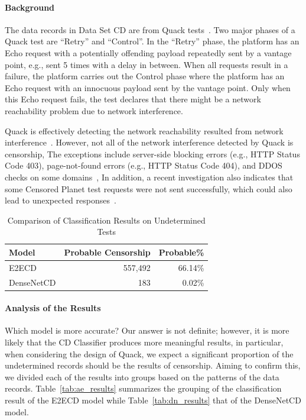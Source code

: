 \paragraph{Background} The data records in Data Set CD are from Quack 
tests~\cite{vandersloot2018quack}. Two major phases of a Quack test are 
``Retry'' and ``Control''. In the ``Retry'' phase, the platform has
an Echo request with a potentially offending payload repeatedly sent by 
a vantage point, e.g., sent 5 times with a delay in between. When all 
requests result in a failure, the platform carries out the Control phase
where the platform has an Echo request with an innocuous payload sent by
the vantage point. Only when this Echo request fails, the test declares
that there might be a network reachability problem due to network 
interference. 

Quack is effectively detecting the network reachability resulted from network
interference~\cite{vandersloot2018quack}. However, not all of the network 
interference detected by Quack is censorship, The exceptions include server-side
blocking errors (e.g., HTTP Status Code 403), page-not-found errors (e.g., HTTP
Status Code 404), and DDOS checks on some domains~\cite{raman_measuring_2020}, In 
addition, a recent investigation also indicates that some Censored Planet test 
requests were not sent successfully, which could also lead to unexpected responses~\cite{niaki2020iclab}.


\begin{table}[!htbp]
	\centering
	\caption{Comparison of Classification Results on Undetermined Tests}
	\label{tab:eval:undetermine}
	\begin{tabular}{p{} r r}
		\toprule
		Model & Probable Censorship & Probable\% \\
		\midrule
		E2ECD & 557,492 & 66.14\%\\
		DenseNetCD & 183 & 0.02\%\\
		\bottomrule
	\end{tabular}
\end{table}

\paragraph{Analysis of the Results}
Which model is more accurate? Our answer is not definite; however, it is more
likely that the CD Classifier produces more meaningful results, in particular, 
when considering the design of Quack, we expect a significant proportion of 
the undetermined records should be the results of censorship. Aiming to confirm
this, we divided each of the results into
groups based on the patterns of the data records.  Table~\ref{tab:ae_results} 
summarizes the grouping of the
classification result of the E2ECD model while Table~\ref{tab:dn_results} that
of the DenseNetCD model.


